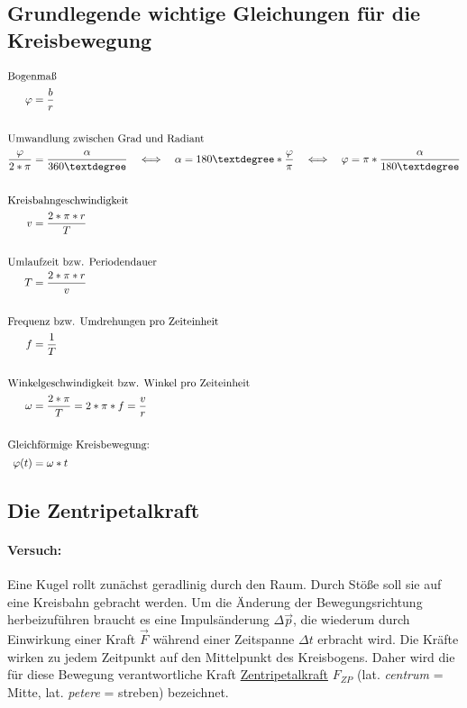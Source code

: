 \documentclass[12pt]{article}
\numberwithin{equation}{subsection}
\begin{document}
	\subsection{Grundlegende wichtige Gleichungen für die Kreisbewegung}
	\begin{align}
		\shortintertext{Bogenmaß}
		\varphi &= \dfrac{b}{r}\\
		\nonumber\\
		\shortintertext{Umwandlung zwischen Grad und Radiant}
		\dfrac{\varphi}{2*\pi} &= \dfrac{\alpha}{360°} \quad \Longleftrightarrow \quad \alpha = 180°*\dfrac{\varphi}{\pi} \quad \Longleftrightarrow \quad \varphi = \pi*\dfrac{\alpha}{180°}\\
		\nonumber\\
		\shortintertext{Kreisbahngeschwindigkeit}
		v &= \dfrac{2*\pi*r}{T}\\
		\nonumber\\
		\shortintertext{Umlaufzeit bzw. Periodendauer}
		T &= \dfrac{2*\pi*r}{v}\\
		\nonumber\\
		\shortintertext{Frequenz bzw. Umdrehungen pro Zeiteinheit}
		f &= \dfrac{1}{T}\\
		\nonumber\\
		\shortintertext{Winkelgeschwindigkeit bzw. Winkel pro Zeiteinheit}
		\omega &= \dfrac{2*\pi}{T} = 2*\pi*f = \dfrac{v}{r}\\
		\nonumber\\
		\intertext{Gleichförmige Kreisbewegung:}
		\varphi(t) &= \omega*t
	\end{align}
	
	\subsection{Die Zentripetalkraft}
	\paragraph{Versuch:}
	Eine Kugel rollt zunächst geradlinig durch den Raum. Durch Stöße soll sie auf eine Kreisbahn gebracht werden.
	Um die Änderung der Bewegungsrichtung herbeizuführen braucht es eine Impulsänderung $ \Delta \vec{p} $, die wiederum durch Einwirkung einer Kraft $ \vec{F} $ während einer Zeitspanne $ \Delta t $ erbracht wird. Die Kräfte wirken zu jedem Zeitpunkt auf den Mittelpunkt des Kreisbogens. Daher wird die für diese Bewegung verantwortliche Kraft \underline{Zentripetalkraft} $ F_{ZP} $ (lat. \textit{centrum} = Mitte, lat. \textit{petere} = streben) bezeichnet.
\end{document}
